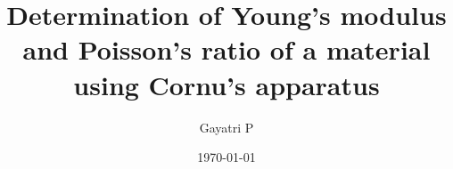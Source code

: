 \documentclass[reprint,amsmath,amssymb,aps]{revtex4-2}
\begin{document}
    \title{Determination of Young’s modulus and Poisson's ratio of a material\\using Cornu’s apparatus }

    \author{Gayatri P}
    \date{\today}

    
    \maketitle


    
    
    
    
    
    

    
    
    \nocite{*}
\end{document}
